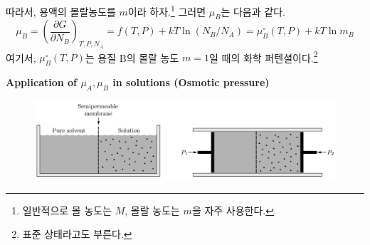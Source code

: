 \documentclass{article}
\begin{document}
따라서, 용액의 몰랄농도를 $m$이라 하자.\footnote{일반적으로 몰 농도는 $M$, 몰랄 농도는 $m$을 자주 사용한다.} 그러면 $\mu_B$는 다음과 같다.
\begin{equation}
    \mu_B = \left( \frac{\partial G}{\partial N_B} \right)_{T,P,N_A} = f(T,P) + kT \ln (N_B / N_A) = \mu_B^\circ (T,P) + kT \ln m_B
\end{equation}
여기서, $\mu_B^\circ (T,P)$는 용질 B의 몰랄 농도 $m=1$일 때의 화학 퍼텐셜이다.\footnote{표준 상태라고도 부른다.}

\vspace{3mm}\noindent
\textbf{Application of $\mu_A, \mu_B$ in solutions (Osmotic pressure)}

\begin{figure}[h]
    \centering
    \includegraphics[width=0.9\linewidth]{images/fig5_2.png}
\end{figure}
\end{document}
